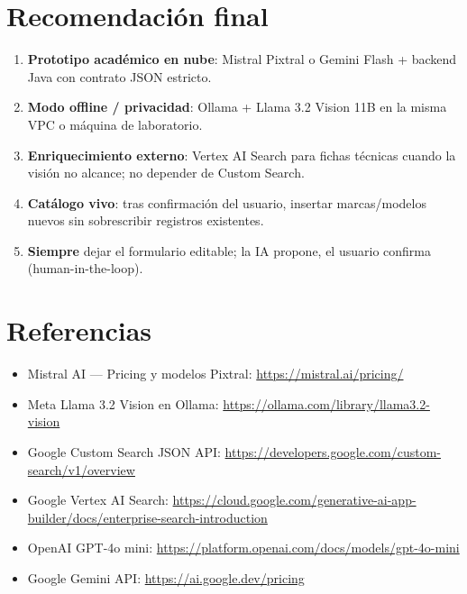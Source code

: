 \documentclass[11pt,a4paper]{article}
\begin{document}
\section{Recomendación final}

\begin{enumerate}[leftmargin=*]
  \item \textbf{Prototipo académico en nube}: Mistral Pixtral o Gemini Flash + backend Java con contrato JSON estricto.
  \item \textbf{Modo offline / privacidad}: Ollama + Llama 3.2 Vision 11B en la misma VPC o máquina de laboratorio.
  \item \textbf{Enriquecimiento externo}: Vertex AI Search para fichas técnicas cuando la visión no alcance; no depender de Custom Search.
  \item \textbf{Catálogo vivo}: tras confirmación del usuario, insertar marcas/modelos nuevos sin sobrescribir registros existentes.
  \item \textbf{Siempre} dejar el formulario editable; la IA propone, el usuario confirma (human-in-the-loop).
\end{enumerate}

\section{Referencias}

\begin{itemize}[leftmargin=*]
  \item Mistral AI --- Pricing y modelos Pixtral: \url{https://mistral.ai/pricing/}
  \item Meta Llama 3.2 Vision en Ollama: \url{https://ollama.com/library/llama3.2-vision}
  \item Google Custom Search JSON API: \url{https://developers.google.com/custom-search/v1/overview}
  \item Google Vertex AI Search: \url{https://cloud.google.com/generative-ai-app-builder/docs/enterprise-search-introduction}
  \item OpenAI GPT-4o mini: \url{https://platform.openai.com/docs/models/gpt-4o-mini}
  \item Google Gemini API: \url{https://ai.google.dev/pricing}
\end{itemize}
\end{document}
